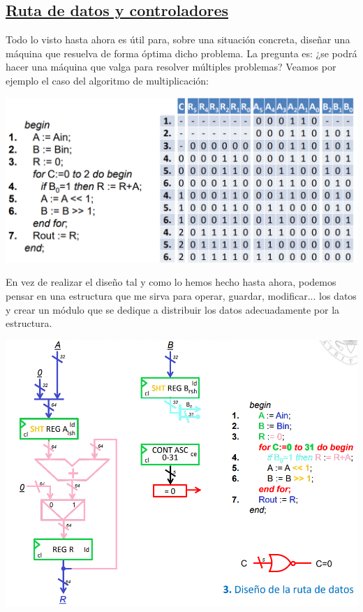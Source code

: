 \documentclass[a4paper,10pt]{book}
\begin{document}
\subsection*{\underline{Ruta de datos y controladores}}
Todo lo visto hasta ahora es útil para, sobre una situación concreta, diseñar una máquina que resuelva de forma óptima dicho problema. La pregunta es: ¿se podrá hacer una máquina que valga para resolver múltiples problemas? Veamos por ejemplo el caso del algoritmo de multiplicación:
\begin{center}
\includegraphics[scale=0.51]{algoritmo de multiplicacion}
\end{center}
En vez de realizar el diseño tal y como lo hemos hecho hasta ahora, podemos pensar en una estructura que me sirva para operar, guardar, modificar... los datos y crear un módulo que se dedique a distribuir los datos adecuadamente por la estructura.
\begin{center}
\includegraphics[scale=0.4]{ruta de datos buena}
\end{center}
\end{document}

